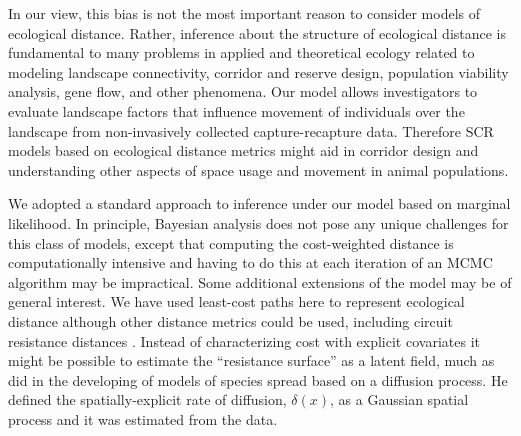 \documentclass[12pt]{article}
\begin{document}
\begin{spacing}{1.8}
In our view, this bias is not the most important reason to
consider models of ecological distance. Rather, inference about the
structure of ecological distance is fundamental to many problems in
applied and theoretical ecology related to modeling landscape
connectivity, corridor and reserve design, population viability
analysis, gene flow, and other phenomena.  Our  model allows
investigators to evaluate landscape factors that influence movement of
individuals over the landscape from non-invasively collected
capture-recapture data.  Therefore SCR models based on ecological
distance metrics might aid in corridor design and understanding other
aspects of space usage and movement in animal populations.

We adopted a standard approach to inference under our model based on
marginal likelihood. In principle, 
Bayesian analysis does not pose any unique challenges for this 
class of models, except that computing the cost-weighted distance is
computationally intensive and having to do this at each iteration of
an MCMC algorithm may be impractical.  
Some additional extensions of the model may be of general interest.
We have used least-cost paths here to represent ecological distance
although other distance metrics could be used, including circuit
resistance distances \citep{mcrae:2006}.
Instead of
characterizing cost with explicit covariates it might be possible to
estimate the ``resistance surface'' as a latent field, much as
\citep{wikle:2003} did in the developing of models of species spread
based on a diffusion process. He defined the spatially-explicit rate
of diffusion, $\delta(x)$, as a Gaussian spatial process and it was
estimated from the data.









\newpage





\end{spacing}



\clearpage

\newpage
\end{document}
